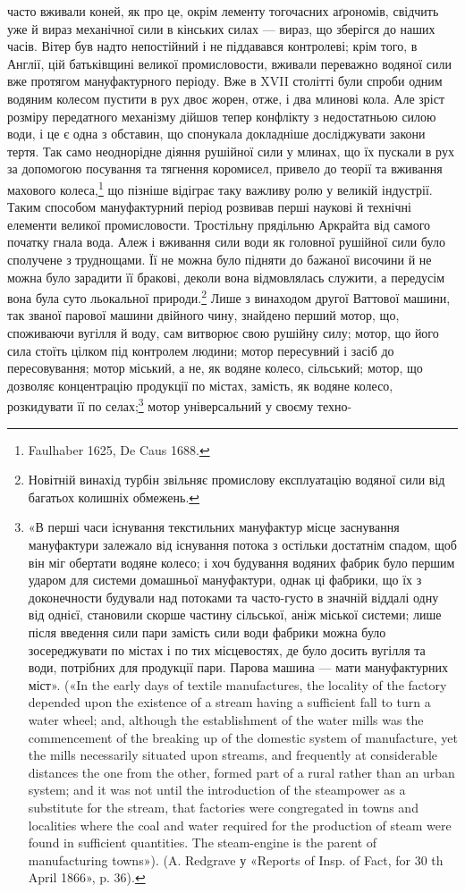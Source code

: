 часто вживали коней, як про це, окрім лементу тогочасних аґрономів,
свідчить уже й вираз механічної сили в кінських силах —
вираз, що зберігся до наших часів. Вітер був надто непостійний
і не піддавався контролеві; крім того, в Англії, цій батьківщині
великої промисловости, вживали переважно водяної сили вже
протягом мануфактурного періоду. Вже в XVII столітті були
спроби одним водяним колесом пустити в рух двоє жорен, отже, і
два млинові кола. Але зріст розміру передатного механізму дійшов
тепер конфлікту з недостатньою силою води, і це є одна з обставин,
що спонукала докладніше досліджувати закони тертя. Так
само неоднорідне діяння рушійної сили у млинах, що їх пускали
в рух за допомогою посування та тягнення коромисел, привело
до теорії та вживання махового колеса,\footnote{
Faulhaber 1625, De Caus 1688.
} що пізніше відіграє
таку важливу ролю у великій індустрії. Таким способом мануфактурний
період розвивав перші наукові й технічні елементи
великої промисловости. Тростільну прядільню Аркрайта від
самого початку гнала вода. Алеж і вживання сили води як
головної рушійної сили було сполучене з труднощами. Її не можна
було підняти до бажаної височини й не можна було зарадити її
бракові, деколи вона відмовлялась служити, а передусім вона
була суто льокальної природи.\footnote{
Новітній винахід турбін звільняє промислову експлуатацію
водяної сили від багатьох колишніх обмежень.
} Лише з винаходом другої Ваттової
машини, так званої парової машини двійного чину, знайдено
перший мотор, що, споживаючи вугілля й воду, сам витворює
свою рушійну силу; мотор, що його сила стоїть цілком під контролем
людини; мотор пересувний і засіб до пересовування; мотор
міський, а не, як водяне колесо, сільський; мотор, що дозволяє
концентрацію продукції по містах, замість, як водяне колесо,
розкидувати її по селах;\footnote{
«В перші часи існування текстильних мануфактур місце заснування
мануфактури залежало від існування потока з остільки достатнім
спадом, щоб він міг обертати водяне колесо; і хоч будування водяних
фабрик було першим ударом для системи домашньої мануфактури, однак
ці фабрики, що їх з доконечности будували над потоками та часто-густо
в значній віддалі одну від однієї, становили скорше частину сільської, аніж
міської системи; лише після введення сили пари замість сили води фабрики
можна було зосереджувати по містах і по тих місцевостях, де було досить
вугілля та води, потрібних для продукції пари. Парова машина — мати
мануфактурних міст». («In the early days of textile manufactures, the locality
of the factory depended upon the existence of a stream having a sufficient
fall to turn a water wheel; and, although the establishment of the water
mills was the commencement of the breaking up of the domestic system of
manufacture, yet the mills necessarily situated upon streams, and frequently
at considerable distances the one from the other, formed part of a rural rather
than an urban system; and it was not until the introduction of the steampower
as a substitute for the stream, that factories were congregated in towns and
localities where the coal and water required for the production of steam were
found in sufficient quantities. The steam-engine is the parent of manufacturing
towns»). (A. Redgrave у «Reports of Insp. of Fact, for 30 th
April 1866», p. 36).
} мотор універсальний у своєму техно-